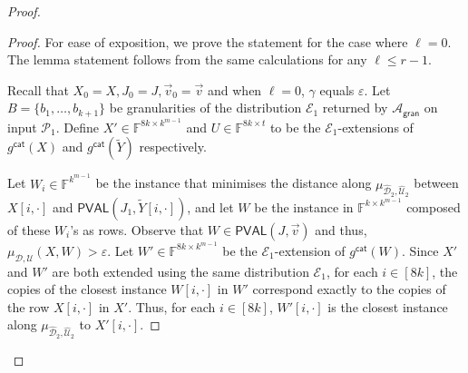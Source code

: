\documentclass[10pt,a4paper]{article}
\newcommand{\PVAL}{\mathsf{PVAL}}
\newcommand{\gran}{\mathsf{gran}}
\newcommand{\F}{\mathbb{F}}
\newcommand{\sU}{\mathcal{U}}
\newcommand{\sD}{\mathcal{D}}
\newcommand{\sA}{\mathcal{A}}
\newcommand{\sP}{\mathcal{P}}
\begin{document}
\begin{proof}
\begin{proof}
    For ease of exposition, we prove the statement for the case where $\ell = 0$. The lemma statement follows from the same calculations for any $\ell \leq r-1$. 
    
    Recall that $X_0 = X, J_0 = J, \Vec{v}_0 = \Vec{v}$ and when $\ell=0$, $\gamma$ equals $\varepsilon$. Let $B = \{b_1, \dots, b_{k+1}\}$ be granularities of the distribution $\mathcal{E}_1$ returned by $\sA_\gran$ on input $\sP_1$. Define $X' \in \F^{8k \times k^{m-1}}$ and $U \in \F^{8k \times t}$ to be the $\mathcal{E}_1$-extensions of $g^{\mathsf{cat}}(X)$ and $g^{\mathsf{cat}}(\widetilde{Y})$ respectively. 
    
    Let $W_i \in \F^{k^{m-1}}$ be the instance that minimises the distance along $\mu_{\widehat{\sD}_{2}, \widehat{\sU}_{2}}$ between $X[i,\cdot]$ and $\PVAL(J_{1}, \widetilde{Y}[i,\cdot])$, and let $W$ be the instance in $\F^{k \times k^{m-1}}$ composed of these $W_i$'s as rows. Observe that $W \in \PVAL(J,\Vec{v})$ and thus, $\mu_{\sD, \sU}(X,W) > \varepsilon$. Let $W' \in \F^{8k \times k^{m-1}}$ be the $\mathcal{E}_1$-extension of $g^\mathsf{cat}(W)$. Since $X'$ and $W'$ are both extended using the same distribution $\mathcal{E}_1$, for each $i \in [8k]$, the copies of the closest instance $W[i,\cdot]$ in $W'$ correspond exactly to the copies of the row $X[i,\cdot]$ in $X'$. Thus, for each $i \in [8k]$, $W'[i,\cdot]$ is the closest instance along $\mu_{\widehat{\sD}_{2}, \widehat{\sU}_{2}}$ to $X'[i,\cdot]$. 
   

\end{proof}
\end{proof}
\end{document}
